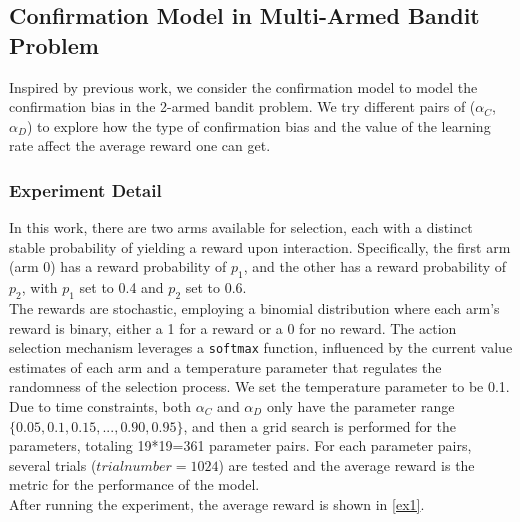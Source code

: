 \documentclass[10pt,letterpaper]{article}
\begin{document}
\subsection{Confirmation Model in Multi-Armed Bandit Problem}
Inspired by previous work\cite{lefebvre2022normative}, we consider the confirmation model to model the confirmation bias in the 2-armed bandit problem. We try different pairs of ($\alpha_C$,$\alpha_D$) to explore how the type of confirmation bias and the value of the learning rate affect the average reward one can get.
\subsubsection{Experiment Detail}
In this work, there are two arms available for selection, each with a distinct stable probability of yielding a reward upon interaction. Specifically, the first arm (arm 0) has a reward probability of $p_1$, and the other has a reward probability of $p_2$, with $p_1$ set to 0.4 and $p_2$ set to 0.6.\\
The rewards are stochastic, employing a binomial distribution where each arm's reward is binary, either a 1 for a reward or a 0 for no reward. The action selection mechanism leverages a \texttt{softmax} function, influenced by the current value estimates of each arm and a temperature parameter that regulates the randomness of the selection process. We set the temperature parameter to be 0.1.\\
Due to time constraints, both $\alpha_C$ and $\alpha_D$ only have the parameter range $\{0.05,0.1,0.15,...,0.90,0.95\}$, and then a grid search is performed for the parameters, totaling 19*19=361 parameter pairs. For each parameter pairs, several trials ($trial number=1024$) are tested and the average reward is the metric for the performance of the model.\\
After running the experiment, the average reward is shown in \autoref{ex1}.
\end{document}
